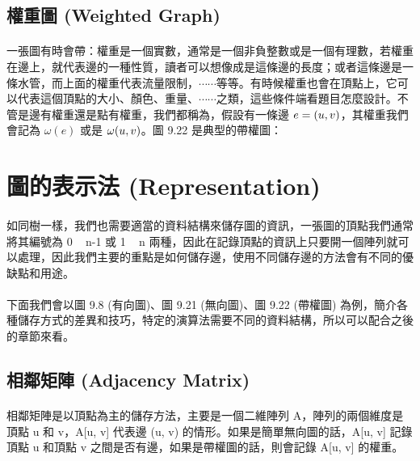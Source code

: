 \documentclass[12pt,a4paper,oneside]{report}
\begin{document}
\begin{CJK}{UTF8}{bkai}
\subsection{權重圖 (Weighted Graph)}
\paragraph{}一張圖有時會帶\textbf{}：權重是一個實數，通常是一個非負整數或是一個有理數，若權重在邊上，就代表邊的一種性質，讀者可以想像成是這條邊的長度；或者這條邊是一條水管，而上面的權重代表流量限制，$\cdots\cdots$等等。有時候權重也會在頂點上，它可以代表這個頂點的大小、顏色、重量、$\cdots\cdots$之類，這些條件端看題目怎麼設計。不管是邊有權重還是點有權重，我們都稱為\textbf{}，假設有一條邊 $e=({u},{v})$，其權重我們會記為 $\omega{(e)}$ 或是 $\omega{\ensuremath{({u},{v})}}$。圖 9.22 是典型的帶權圖：

\section{圖的表示法 (Representation)}

\paragraph{}如同樹一樣，我們也需要適當的資料結構來儲存圖的資訊，一張圖的頂點我們通常將其編號為 0 ~ n-1 或 1 ~ n 兩種，因此在記錄頂點的資訊上只要開一個陣列就可以處理，因此我們主要的重點是如何儲存邊，使用不同儲存邊的方法會有不同的優缺點和用途。
\paragraph{}下面我們會以圖 9.8 (有向圖)、圖 9.21 (無向圖)、圖 9.22 (帶權圖) 為例，簡介各種儲存方式的差異和技巧，特定的演算法需要不同的資料結構，所以可以配合之後的章節來看。

\subsection{相鄰矩陣 (Adjacency Matrix)}

\paragraph{}相鄰矩陣是以頂點為主的儲存方法，主要是一個二維陣列 A，陣列的兩個維度是頂點 u 和 v，A[u, v] 代表邊 (u, v) 的情形。如果是簡單無向圖的話，A[u, v] 記錄頂點 u 和頂點 v 之間是否有邊，如果是帶權圖的話，則會記錄 A[u, v] 的權重。

\end{CJK}
\end{document}
